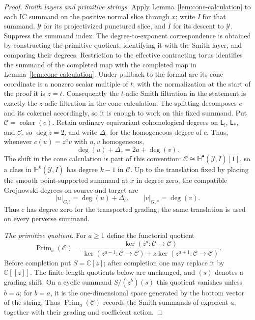 \documentclass[10pt,a4paper]{amsart}
\begin{document}
\begin{proof}
\smallskip
\noindent\emph{Smith layers and primitive strings.}
Apply Lemma~\ref{lem:cone-calculation} to each IC summand on the positive
normal slice through $x$; write $I$ for that summand,
$\mathcal Y$ for its projectivized punctured slice, and $\overline I$ for its
descent to $\mathcal Y$.  Suppress the summand index.  The
degree-to-exponent correspondence is obtained by constructing the primitive
quotient, identifying it with the Smith layer, and comparing their degrees.
Restriction to the effective contracting torus identifies the summand of
the completed map with the completed map in
Lemma~\ref{lem:cone-calculation}.  Under pullback to the formal arc its cone
coordinate is a nonzero scalar multiple of $t$; with the normalization at
the start of the proof it is $z=t$.  Consequently the $t$-adic Smith
filtration in the statement is exactly the $z$-adic filtration in the cone
calculation.  The splitting decomposes $c$ and its cokernel accordingly, so
it is enough to work on this fixed summand.
Put $\mathcal C=\operatorname{coker}(c)$.
Retain ordinary equivariant cohomological degrees on $\mathsf L_!$,
$\mathsf L_*$, and
$\mathcal C$, so $\deg z=2$, and write $\Delta_c$ for the homogeneous degree
of $c$.
Thus, whenever $c(u)=z^av$ with $u,v$ homogeneous,
\begin{equation}\label{eq:degree-balance}
 \deg(u)+\Delta_c=2a+\deg(v).
\end{equation}
The shift in the cone calculation is part of this convention:
$\mathcal C\cong\mathbb H^\bullet(\mathcal Y,\overline I)[1]$, so a class in
$\mathbb H^k(\mathcal Y,\overline I)$ has degree $k-1$ in $\mathcal C$.
Up to the translation fixed by placing the smooth point-supported summand
at $x$ in degree zero, the compatible Grojnowski degrees on source and
target are
\begin{equation}\label{eq:grojnowski-source-degree}
 |u|_{G,!}=\deg(u)+\Delta_c,
 \qquad |v|_{G,*}=\deg(v).
\end{equation}
Thus $c$ has degree zero for the transported grading; the same
translation is used on every perverse summand.

\smallskip
\noindent\emph{The primitive quotient.}
For $a\geq1$ define the functorial quotient
\begin{equation}\label{eq:primitive-string-quotient}
 \operatorname{Prim}_a(\mathcal C)=
 \frac{\ker(z^a:\mathcal C\to\mathcal C)}
 {\ker(z^{a-1}:\mathcal C\to\mathcal C)+
  z\ker(z^{a+1}:\mathcal C\to\mathcal C)}.
\end{equation}
Before completion put $S=\mathbb C[z]$; after completion one may replace it
by $\mathbb C[[z]]$.  The finite-length quotients below are unchanged, and
$(s)$ denotes a grading shift.  On a cyclic summand $S/(z^b)(s)$ this quotient
vanishes unless $b=a$; for
$b=a$, it is the one-dimensional space generated by the bottom vector of the
string.  Thus $\operatorname{Prim}_a(\mathcal C)$ records the Smith summands
of exponent $a$, together with their grading and coefficient action.


\end{proof}
\end{document}

